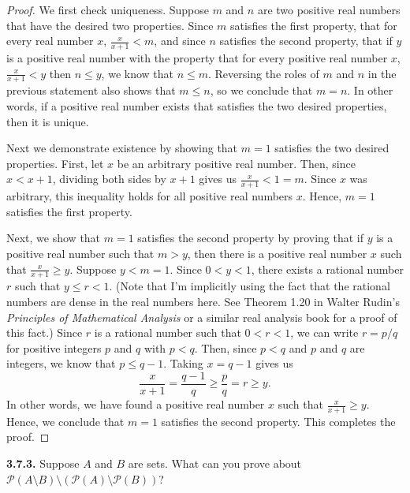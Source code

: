 \documentclass[12pt]{amsart}
\newenvironment{statement}[1]{\smallskip\noindent\color[rgb]{.6627, .3529, .6314} {\bf #1.}}{}
\theoremstyle{definition}
\theoremstyle{remark}
\newcommand{\powerset}[1]{\mathscr{P} \left( #1 \right)}
\begin{document}
\begin{proof}
We first check uniqueness.
Suppose $m$ and $n$ are two positive real numbers that have the desired two properties.
Since $m$ satisfies the first property, that for every real number $x$, $\frac{x}{x + 1} < m$, and since $n$ satisfies the second property, that if $y$ is a positive real number with the property that for every positive real number $x$, $\frac{x}{x + 1} < y$ then $n \leq y$, we know that $n \leq m$.
Reversing the roles of $m$ and $n$ in the previous statement also shows that $m \leq n$, so we conclude that $m = n$.
In other words, if a positive real number exists that satisfies the two desired properties, then it is unique.

Next we demonstrate existence by showing that $m = 1$ satisfies the two desired properties.
First, let $x$ be an arbitrary positive real number.
Then, since $x < x + 1$, dividing both sides by $x + 1$ gives us $\frac{x}{x + 1} < 1 = m$.
Since $x$ was arbitrary, this inequality holds for all positive real numbers $x$.
Hence, $m = 1$ satisfies the first property.

Next, we show that $m = 1$ satisfies the second property by proving that if $y$ is a positive real number such that $m > y$, then there is a positive real number $x$ such that $\frac{x}{x + 1} \geq y$.
Suppose $y < m = 1$.
Since $0 < y < 1$, there exists a rational number $r$ such that $y \leq r < 1$.
(Note that I'm implicitly using the fact that the rational numbers are dense in the real numbers here. 
See Theorem 1.20 in Walter Rudin's \emph{Principles of Mathematical Analysis} or a similar real analysis book for a proof of this fact.)
Since $r$ is a rational number such that $0 < r < 1$, we can write $r = p/q$ for positive integers $p$ and $q$ with $p < q$.
Then, since $p < q$ and $p$ and $q$ are integers, we know that $p \leq q - 1$.
Taking $x = q - 1$ gives us
\begin{equation*}
	\frac{x}{x + 1} = \frac{q - 1}{q} \geq \frac{p}{q} = r \geq y.
\end{equation*}
In other words, we have found a positive real number $x$ such that $\frac{x}{x + 1} \geq y$.
Hence, we conclude that $m = 1$ satisfies the second property.
This completes the proof.
\end{proof}


\begin{statement}{3.7.3}
Suppose $A$ and $B$ are sets.
What can you prove about $\powerset{A \setminus B} \setminus (\powerset{A} \setminus \powerset{B})$?
\end{statement}
\end{document}
